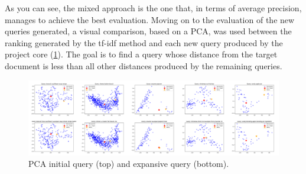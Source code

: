 As you can see, the mixed approach is the one that, in terms of average precision, manages to achieve the best evaluation.
Moving on to the evaluation of the new queries generated, a visual comparison, based on a PCA, was used between the ranking 
generated by the tf-idf method and each new query produced by the project core (\ref{PCA}). The goal is to find a query whose distance 
from the target document is less than all other distances produced by the remaining queries.
\begin{figure}[h!]
    \centering
    \includegraphics[width =\linewidth]{images/PCA paper/PCA all.png}
    \centering
    \caption{PCA initial query (top) and expansive query (bottom).}
    \label{PCA}
\end{figure}
